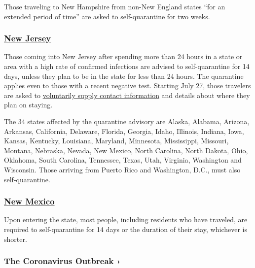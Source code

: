 Those traveling to New Hampshire from non-New England states ``for an
extended period of time'' are asked to self-quarantine for two weeks.

\hypertarget{new-jersey}{%
\subsubsection{\texorpdfstring{\href{https://covid19.nj.gov/faqs/nj-information/general-public/which-states-are-on-the-travel-advisory-list-are-there-travel-restrictions-to-or-from-new-jersey}{New
Jersey}}{New Jersey}}\label{new-jersey}}

Those coming into New Jersey after spending more than 24 hours in a
state or area with a high rate of confirmed infections are advised to
self-quarantine for 14 days, unless they plan to be in the state for
less than 24 hours. The quarantine applies even to those with a recent
negative test. Starting July 27, those travelers are asked to
\href{https://covid19.nj.gov/forms/njtravel}{voluntarily supply contact
information} and details about where they plan on staying.

The 34 states affected by the quarantine advisory are Alaska, Alabama,
Arizona, Arkansas, California, Delaware, Florida, Georgia, Idaho,
Illinois, Indiana, Iowa, Kansas, Kentucky, Louisiana, Maryland,
Minnesota, Mississippi, Missouri, Montana, Nebraska, Nevada, New Mexico,
North Carolina, North Dakota, Ohio, Oklahoma, South Carolina, Tennessee,
Texas, Utah, Virginia, Washington and Wisconsin. Those arriving from
Puerto Rico and Washington, D.C., must also self-quarantine.

\hypertarget{new-mexico}{%
\subsubsection{\texorpdfstring{\href{https://www.newmexico.org/covid-19-traveler-information/}{New
Mexico}}{New Mexico}}\label{new-mexico}}

Upon entering the state, most people, including residents who have
traveled, are required to self-quarantine for 14 days or the duration of
their stay, whichever is shorter.

\href{https://www.nytimes3xbfgragh.onion/news-event/coronavirus?action=click\&pgtype=Article\&state=default\&region=MAIN_CONTENT_3\&context=storylines_faq}{}

\hypertarget{the-coronavirus-outbreak-}{%
\subsubsection{The Coronavirus Outbreak
›}\label{the-coronavirus-outbreak-}}

